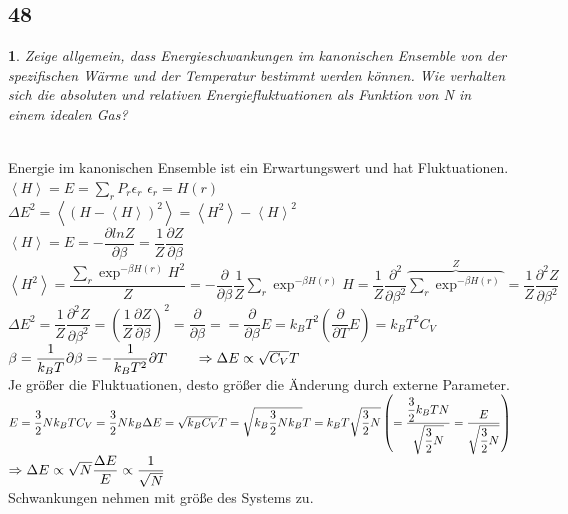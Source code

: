 \documentclass[12pt,a4paper]{report}
\newtheorem{myfrag}{}%
\begin{document}
\subsection{48}
\begin{myfrag}
Zeige allgemein, dass Energieschwankungen im kanonischen Ensemble von der
spezifischen Wärme und der Temperatur bestimmt werden können. Wie verhalten
sich die absoluten und relativen Energiefluktuationen als Funktion von N in einem
idealen Gas?
\end{myfrag} \quad \\
Energie im kanonischen Ensemble ist ein Erwartungswert und hat Fluktuationen. \\[1.5ex]
$ \left\langle H \right\rangle = E = \sum \limits _r P_r \epsilon _r$ \qquad $ \epsilon _r = H(r)$ 
\\[1ex]
$\Delta E^2 = \left\langle (H-\left\langle H\right\rangle )^2\right\rangle = \left\langle H^2\right\rangle -\left\langle H\right\rangle^2$
\\[1ex]
$ \left\langle H \right\rangle = E = -\dfrac{\partial ln Z}{\partial \beta } = \dfrac{1}{Z} \dfrac{\partial Z}{\partial \beta}$
\\[1ex]
$ \left\langle H^2 \right\rangle = \dfrac{\sum \limits_r \exp ^{-\beta H(r)}H^2}{Z} = - \dfrac{\partial }{\partial \beta} \dfrac{1}{Z} \sum \limits_r \exp ^{-\beta H(r)} H = \dfrac{1}{Z}\dfrac{\partial ^2}{\partial \beta ^2} \overbrace{\sum \limits _r \exp ^{-\beta H(r)}}^Z = \dfrac{1}{Z}\dfrac{\partial ^2 Z}{\partial \beta ^2}$
\\[1ex]
$\Delta E^2 = \dfrac{1}{Z} \dfrac{\partial ^2 Z}{\partial \beta ^2} = \left( \dfrac{1}{Z}\dfrac{\partial Z}{\partial \beta} \right)^2 = \dfrac{\partial }{\partial \beta}= = \dfrac{\partial}{\partial \beta}E=k_BT^2\left( \dfrac{\partial}{\partial T}E \right)= k_BT^2C_V$
\\[1ex]
$\beta = \dfrac{1}{k_BT} 
\\[1ex]
\partial \beta = - \dfrac{1}{k_BT^2}\partial T\qquad \Rightarrow \Delta E \propto \sqrt{C_V}T$ \\ Je größer die Fluktuationen, desto größer die Änderung durch externe Parameter.
\\[2ex]
$E=\dfrac{3}{2}Nk_BT \\[1ex]
C_V = \dfrac{3}{2} Nk_B \\[1ex]
\Delta E = \sqrt{k_BC_V}T= \sqrt{k_B\dfrac{3}{2}Nk_B}T=k_BT\sqrt{\dfrac{3}{2}N}\left( = \dfrac{\dfrac{3}{2}k_BTN}{\sqrt{\dfrac{3}{2}N}}=\dfrac{E}{\sqrt{\dfrac{3}{2}N}}\right)$ \\[1ex]
$\Rightarrow \Delta E \propto \sqrt{N}\\[1ex]
\dfrac{\Delta E}{E} \propto \dfrac{1}{\sqrt{N}}$\\Schwankungen nehmen mit größe des Systems zu.
\end{document}
